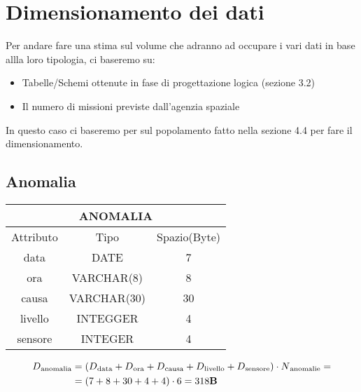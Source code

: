 \section{Dimensionamento dei dati}
Per andare fare una stima sul volume che adranno ad occupare i vari dati in base allla loro tipologia, ci baseremo su:
\begin{itemize}
\item Tabelle/Schemi ottenute in fase di progettazione logica (sezione 3.2)
\item Il numero di missioni previste dall'agenzia spaziale
\end{itemize}
In questo caso ci baseremo per sul popolamento fatto nella sezione 4.4 per fare il dimensionamento.
\subsection{Anomalia}
\begin{tabular}{|c|c|c|}
  \hline
  \multicolumn{3}{|c|}{\textbf{ANOMALIA}}\\
  \hline
  Attributo & Tipo & Spazio(Byte) \\
  \hline
  data & DATE & 7 \\
  ora & VARCHAR(8)  & 8 \\
  causa & VARCHAR(30) & 30 \\
  livello & INTEGGER & 4 \\
  sensore & INTEGER & 4 \\
  \hline
\end{tabular}
\begin{equation}
  \begin{aligned}
    D{\text{\textsubscript{anomalia}}}&=(D{\text{\textsubscript{data}}} + D{\text{\textsubscript{ora}}} +D{\text{\textsubscript{causa}}} +D{\text{\textsubscript{livello}}} + D{\text{\textsubscript{sensore}}}) \cdot N{\text{\textsubscript{anomalie}}}=\\
    &=(7+8+30+4+4)\cdot 6 = 318\text{\textbf{B}}\\
  \end{aligned}
\end{equation}
